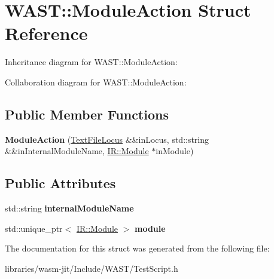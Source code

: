 \hypertarget{struct_w_a_s_t_1_1_module_action}{}\section{W\+A\+ST\+:\+:Module\+Action Struct Reference}
\label{struct_w_a_s_t_1_1_module_action}


Inheritance diagram for W\+A\+ST\+:\+:Module\+Action\+:


Collaboration diagram for W\+A\+ST\+:\+:Module\+Action\+:
\subsection*{Public Member Functions}
\begin{DoxyCompactItemize}
\item 
\mbox{\label{struct_w_a_s_t_1_1_module_action_a80d63693ea423d1a513892227bdb78ad}} 
{\bfseries Module\+Action} (\mbox{\hyperlink{struct_w_a_s_t_1_1_text_file_locus}{Text\+File\+Locus}} \&\&in\+Locus, std\+::string \&\&in\+Internal\+Module\+Name, \mbox{\hyperlink{struct_i_r_1_1_module}{I\+R\+::\+Module}} $\ast$in\+Module)
\end{DoxyCompactItemize}
\subsection*{Public Attributes}
\begin{DoxyCompactItemize}
\item 
\mbox{\label{struct_w_a_s_t_1_1_module_action_ac89b7027827aa97c470fb8712a2f8249}} 
std\+::string {\bfseries internal\+Module\+Name}
\item 
\mbox{\label{struct_w_a_s_t_1_1_module_action_a8e38660ba4cf568e155d955df76af629}} 
std\+::unique\+\_\+ptr$<$ \mbox{\hyperlink{struct_i_r_1_1_module}{I\+R\+::\+Module}} $>$ {\bfseries module}
\end{DoxyCompactItemize}


The documentation for this struct was generated from the following file\+:\begin{DoxyCompactItemize}
\item 
libraries/wasm-\/jit/\+Include/\+W\+A\+S\+T/Test\+Script.\+h\end{DoxyCompactItemize}
